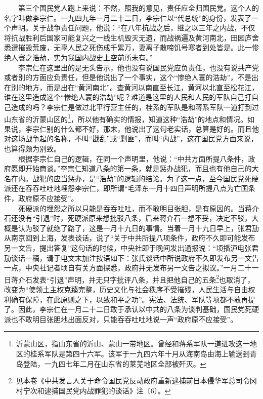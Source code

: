 \documentclass[cn,11pt,chinese]{elegantbook}
\begin{document}
　　第三个国民党人跑上来说：不然，照我的意见，责任应全归国民党。这个人的名字叫做李宗仁。一九四九年一月二十二日，李宗仁以“代总统”的身份，发表了一个声明。关于战争责任问题，他说：“在八年抗战之后，继之以三年之内战，不仅将抗战胜利后国家可能复兴之一线生机毁灭无遗，而战祸遍及黄河南北，田园庐舍悉遭摧毁荒废，无辜人民之死伤成千累万，妻离子散啼饥号寒者到处皆是。此一惨绝人寰之浩劫，实为我国内战史上空前所未有。”\\
　　李宗仁在这里出的是无头告示，他也没有说国民党应负责任，也没有说共产党或者别的方面应负责任，但是他说出了一个事实，这个“惨绝人寰的浩劫”，不是出在别的地方，而是出在“黄河南北”。查黄河以南直至长江，黄河以北直至松花江，谁在这里造成这个“惨绝人寰的浩劫”呢？难道是这里的人民和人民的军队自己打自己造成的吗？李宗仁是做过北平行营主任的，桂系的军队是和蒋系军队一道打到过山东省的沂蒙山区的\footnote[2]{ 沂蒙山区，指山东省的沂山、蒙山一带地区。曾经和蒋系军队一道进攻这一地区的桂系军队是第四十六军。该军于一九四六年十月从海南岛由海上输送到青岛登陆，一九四七年二月在山东省的莱芜地区全部被歼灭。}，所以他有确实的情报，知道这种“浩劫”的地点和情况。如果说，李宗仁别的什么都不好，那末，他说出了这句老实话，总算是好的。而且他对这场战争起的名称，不叫“戡乱”或“剿匪”，而叫“内战”，这在国民党方面来说，也算得颇为别致。\\
　　根据李宗仁自己的逻辑，在同一个声明里，他说：“中共方面所提八条件，政府愿即开始商谈。”李宗仁知道八条的第一条，就是惩办战犯，而且也有他自己的大名在内。战犯的应当惩办，是“浩劫”的逻辑的结论。为了这一点，至今国民党死硬派还在吞吞吐吐地埋怨李宗仁，即所谓“毛泽东一月十四日声明所提八点为亡国条件，政府原不应接受”。\\
　　死硬派的埋怨之所以只能是吞吞吐吐，而不敢明目张胆，是有原因的。当蒋介石还没有“引退”时，死硬派原来想批驳八条，后来蒋介石一想不妥，决定不驳，大概是认为驳了就绝了路了，这是一月十九日的事情。当着一月十九日早上，张君劢从南京回到上海，发表谈话，说了“关于中共所提八项条件，政府不久即可能发布另一文告，提出答复”这句话的时候，中央社即于晚间发出通报说：“顷播沪电张君劢谈话一稿，请于电文末加注按语如下：张氏谈话中所说政府不久即发布另一文告一点，中央社记者顷自有关方面探悉，政府并无发布另一文告之拟议。”一月二十一日蒋介石发表“引退”声明，并无只字批评八条，并且把他自己的五条\footnote[3]{ 见本卷《中共发言人关于命令国民党反动政府重新逮捕前日本侵华军总司令冈村宁次和逮捕国民党内战罪犯的谈话》注〔6〕。}也取消了，改变为“使领土主权克臻完整，历史文化与社会秩序不受摧残，人民生活与自由权利确有保障，在此原则之下，以致和平之功”。宪法、法统、军队等项都不敢再提了。因此，李宗仁在一月二十二日敢于承认以中共的八条为谈判基础，国民党死硬派也不敢明目张胆地出面反对，只能吞吞吐吐地说一声“政府原不应接受”。\\
\end{document}
